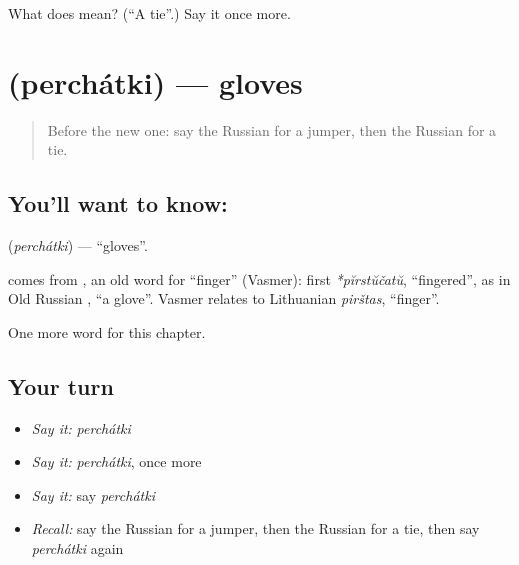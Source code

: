 \begin{tcolorbox}[breakable,colback=teal!4,colframe=teal!35!black,title={Before you move on}]
What does  mean? (\textquotedblleft{}A tie\textquotedblright{}.) Say it once more.
\end{tcolorbox}
\section[\texorpdfstring{\ru{перчатки} (perchátki)}{перчатки (perchátki)}]{ (perchátki) — gloves}

\label{lesson:RU-C101-gloves}



\begin{quote}
Before the new one: say the Russian for a jumper, then the Russian for a tie.
\end{quote}

\subsection*{You'll want to know: }
\textbf{} (\emph{perchátki}) — \textquotedblleft{}gloves\textquotedblright{}.

\begin{cousinweb}
\textbf{} comes from \emph{}, an old word for \textquotedblleft{}finger\textquotedblright{} (Vasmer): first \emph{*pĭrstŭčatŭ}, \textquotedblleft{}fingered\textquotedblright{}, as in Old Russian \emph{}, \textquotedblleft{}a glove\textquotedblright{}. Vasmer relates \emph{} to Lithuanian \emph{pirštas}, \textquotedblleft{}finger\textquotedblright{}.
\end{cousinweb}

\begin{grammarlens}[title={What you've built}]
One more word for this chapter.
\end{grammarlens}

\subsection*{Your turn}
\begin{itemize}
\raggedright
  \item \emph{Say it:} \emph{perchátki}
  \item \emph{Say it:} \emph{perchátki}, once more
  \item \emph{Say it:} say \emph{perchátki}
  \item \emph{Recall:} say the Russian for a jumper, then the Russian for a tie, then say \emph{perchátki} again
\end{itemize}

